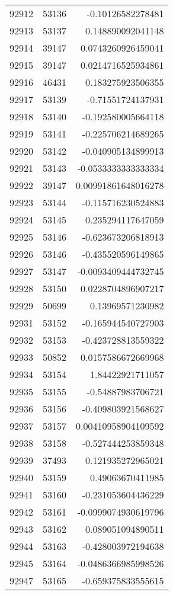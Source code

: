 \begin{tabular}{r | r | r}
92912 & 53136 & -0.10126582278481 \\
92913 & 53137 & 0.148890092041148 \\
92914 & 39147 & 0.0743260926459041 \\
92915 & 39147 & 0.0214716525934861 \\
92916 & 46431 & 0.183275923506355 \\
92917 & 53139 & -0.71551724137931 \\
92918 & 53140 & -0.192580005664118 \\
92919 & 53141 & -0.225706214689265 \\
92920 & 53142 & -0.040905134899913 \\
92921 & 53143 & -0.0533333333333334 \\
92922 & 39147 & 0.00991861648016278 \\
92923 & 53144 & -0.115716230524883 \\
92924 & 53145 & 0.235294117647059 \\
92925 & 53146 & -0.623673206818913 \\
92926 & 53146 & -0.435520596149865 \\
92927 & 53147 & -0.0093409444732745 \\
92928 & 53150 & 0.0228704896907217 \\
92929 & 50699 & 0.13969571230982 \\
92931 & 53152 & -0.165944540727903 \\
92932 & 53153 & -0.423728813559322 \\
92933 & 50852 & 0.0157586672669968 \\
92934 & 53154 & 1.84422921711057 \\
92935 & 53155 & -0.54887983706721 \\
92936 & 53156 & -0.409803921568627 \\
92937 & 53157 & 0.00410958904109592 \\
92938 & 53158 & -0.527444253859348 \\
92939 & 37493 & 0.121935272965021 \\
92940 & 53159 & 0.49063670411985 \\
92941 & 53160 & -0.231053604436229 \\
92942 & 53161 & -0.0999074930619796 \\
92943 & 53162 & 0.089051094890511 \\
92944 & 53163 & -0.428003972194638 \\
92945 & 53164 & -0.0486366985998526 \\
92947 & 53165 & -0.659375833555615 \\

\end{tabular}
